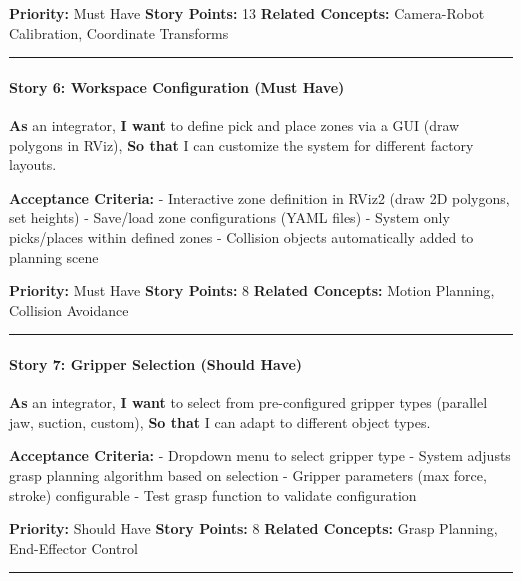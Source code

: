 \documentclass[
]{article}
\begin{document}
\textbf{Priority:} Must Have \textbf{Story Points:} 13 \textbf{Related
Concepts:} Camera-Robot Calibration, Coordinate Transforms

\begin{center}\rule{0.5\linewidth}{0.5pt}\end{center}

\hypertarget{story-6-workspace-configuration-must-have}{%
\paragraph{Story 6: Workspace Configuration (Must
Have)}\label{story-6-workspace-configuration-must-have}}

\textbf{As} an integrator, \textbf{I want} to define pick and place
zones via a GUI (draw polygons in RViz), \textbf{So that} I can
customize the system for different factory layouts.

\textbf{Acceptance Criteria:} - Interactive zone definition in RViz2
(draw 2D polygons, set heights) - Save/load zone configurations (YAML
files) - System only picks/places within defined zones - Collision
objects automatically added to planning scene

\textbf{Priority:} Must Have \textbf{Story Points:} 8 \textbf{Related
Concepts:} Motion Planning, Collision Avoidance

\begin{center}\rule{0.5\linewidth}{0.5pt}\end{center}

\hypertarget{story-7-gripper-selection-should-have}{%
\paragraph{Story 7: Gripper Selection (Should
Have)}\label{story-7-gripper-selection-should-have}}

\textbf{As} an integrator, \textbf{I want} to select from pre-configured
gripper types (parallel jaw, suction, custom), \textbf{So that} I can
adapt to different object types.

\textbf{Acceptance Criteria:} - Dropdown menu to select gripper type -
System adjusts grasp planning algorithm based on selection - Gripper
parameters (max force, stroke) configurable - Test grasp function to
validate configuration

\textbf{Priority:} Should Have \textbf{Story Points:} 8 \textbf{Related
Concepts:} Grasp Planning, End-Effector Control

\begin{center}\rule{0.5\linewidth}{0.5pt}\end{center}
\end{document}
